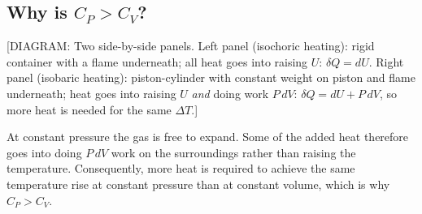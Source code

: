\subsection*{Why is $C_P > C_V$?}

\begin{center}
[DIAGRAM: Two side-by-side panels. Left panel (isochoric heating): rigid container with a flame
underneath; all heat goes into raising $U$: $\delta Q = dU$. Right panel (isobaric heating):
piston-cylinder with constant weight on piston and flame underneath; heat goes into raising $U$
\emph{and} doing work $P\,dV$: $\delta Q = dU + P\,dV$, so more heat is needed for the same
$\Delta T$.]
\end{center}

At constant pressure the gas is free to expand. Some of the added heat therefore goes into doing
$P\,dV$ work on the surroundings rather than raising the temperature. Consequently, more heat is
required to achieve the same temperature rise at constant pressure than at constant volume, which
is why $C_P > C_V$.
